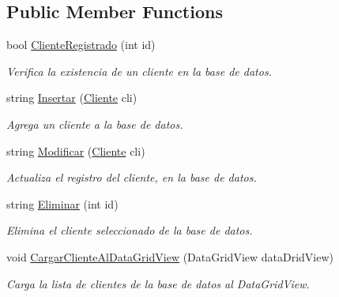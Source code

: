 \subsection*{Public Member Functions}
\begin{DoxyCompactItemize}
\item 
bool \mbox{\hyperlink{class_ejem___mantenimiento___personas_1_1_conexion_a6eb70e84b86424966c75d5859d241a40}{Cliente\+Registrado}} (int id)
\begin{DoxyCompactList}\small\item\em Verifica la existencia de un cliente en la base de datos. \end{DoxyCompactList}\item 
string \mbox{\hyperlink{class_ejem___mantenimiento___personas_1_1_conexion_a8f2099b092af61b02fa7b96c491fe1f5}{Insertar}} (\mbox{\hyperlink{class_ejem___mantenimiento___personas_1_1_cliente}{Cliente}} cli)
\begin{DoxyCompactList}\small\item\em Agrega un cliente a la base de datos. \end{DoxyCompactList}\item 
string \mbox{\hyperlink{class_ejem___mantenimiento___personas_1_1_conexion_a1fc3cac8eff1c8f2f7197b56e7209df6}{Modificar}} (\mbox{\hyperlink{class_ejem___mantenimiento___personas_1_1_cliente}{Cliente}} cli)
\begin{DoxyCompactList}\small\item\em Actualiza el registro del cliente, en la base de datos. \end{DoxyCompactList}\item 
string \mbox{\hyperlink{class_ejem___mantenimiento___personas_1_1_conexion_a97b8be1c8c50cfb4d2f0babd96567262}{Eliminar}} (int id)
\begin{DoxyCompactList}\small\item\em Elimina el cliente seleccionado de la base de datos. \end{DoxyCompactList}\item 
void \mbox{\hyperlink{class_ejem___mantenimiento___personas_1_1_conexion_a7907319c7bc72f21b509cc5812b5896c}{Cargar\+Cliente\+Al\+Data\+Grid\+View}} (Data\+Grid\+View data\+Drid\+View)
\begin{DoxyCompactList}\small\item\em Carga la lista de clientes de la base de datos al Data\+Grid\+View. \end{DoxyCompactList}\end{DoxyCompactItemize}


